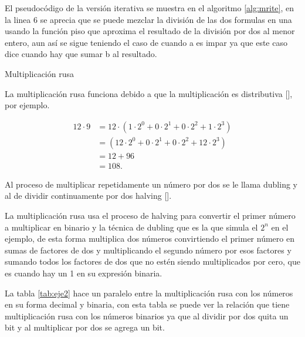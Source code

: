 \documentclass[10pt,journal,compsoc]{IEEEtran}
\begin{document}
El pseudocódigo de la versión iterativa se muestra en el algoritmo \ref{alg:mrite}, en la linea 6 se aprecia que se puede mezclar la división de las dos formulas en una usando la función piso que aproxima el resultado de la división por dos al menor entero, aun así se sigue teniendo el caso de cuando a es impar ya que este caso dice cuando hay que sumar b al resultado.


\begin{algorithm}
\DontPrintSemicolon
{}
\caption{ Multiplicación rusa}
\label{alg:mrite}
\end{algorithm}

La multiplicación rusa funciona debido a que la multiplicación es distributiva [\cite{DP06}], por ejemplo.

\begin{align}
12 \cdot 9 & = 12 \cdot (1\cdot 2^0 +  0\cdot 2^1 + 0\cdot 2^2 +1\cdot 2^3) \\
& = (12\cdot 2^0 +  0\cdot 2^1 + 0\cdot 2^2 +12 \cdot 2^3) \\
& = 12 + 96 \\
& = 108.
\end{align}

Al proceso de multiplicar repetidamente un número por dos se le llama dubling y al de dividir continuamente por dos halving [\cite{DP06}].

La multiplicación rusa usa el proceso de halving para convertir el primer número a multiplicar en binario y la técnica de dubling que es la que simula el $2^n$ en el ejemplo, de esta forma multiplica dos números convirtiendo el primer número en sumas de factores de dos y multiplicando el  segundo número por esos factores y sumando todos los factores de dos que no estén siendo multiplicados por cero, que es cuando hay un 1 en su expresión binaria. 

La tabla \ref{tab:eje2} hace un paralelo entre la multiplicación rusa con los números en su forma decimal y binaria, con esta tabla se puede ver la relación que tiene multiplicación rusa con los números binarios ya que al dividir por dos quita un bit y al multiplicar por dos se agrega un bit.
\end{document}

